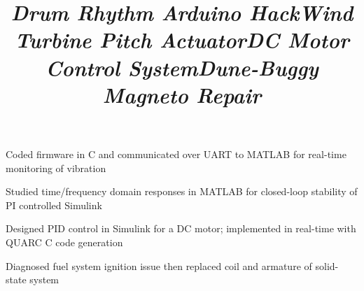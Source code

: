 \documentclass[mm]{res}
\begin{document}
\begin{resume}
\title{\textsl{Drum Rhythm Arduino Hack}}
\begin{position}
\tb Coded firmware in C and communicated over UART to MATLAB for real-time monitoring of vibration
\end{position}

\title{\textsl{Wind Turbine Pitch Actuator}}
\begin{position}
\tb Studied time/frequency domain responses in MATLAB for closed-loop stability of PI controlled Simulink
\end{position}


\title{\textsl{DC Motor Control System}}
\begin{position}
\tb Designed PID control in Simulink for a DC motor; implemented in real-time with QUARC C code generation
\end{position}


\title{\textsl{Dune-Buggy Magneto Repair}}
\begin{position}
\tb Diagnosed fuel system ignition issue then replaced coil and armature of solid-state system
\end{position}

%


\end{resume}
\end{document}
